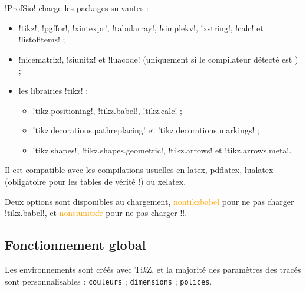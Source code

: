 \documentclass[french,a4paper,11pt]{article}
\providecommand\tikzlogo{Ti\textit{k}Z}
\let\TikZ\tikzlogo
\newcommand\Cle[1]{{\small\sffamily\textlangle \textcolor{orange}{#1}\textrangle}}
\begin{document}
{{

\begin{noteblock}
\packagetex!ProfSio! charge les packages suivantes :

\begin{itemize}
	\item \packagetex!tikz!, \packagetex!pgffor!, \packagetex!xintexpr!, \packagetex!tabularray!, \packagetex!simplekv!, \packagetex!xstring!, \packagetex!calc! et \packagetex!listofitems! ;
	\item \packagetex!nicematrix!, \packagetex!siunitx! et \packagetex!luacode! (uniquement si le compilateur détecté est ) ;
	\item les librairies \packagetex!tikz! :
	\begin{itemize}
		\item \motcletex!tikz.positioning!, \motcletex!tikz.babel!, \motcletex!tikz.calc! ;
		\item \motcletex!tikz.decorations.pathreplacing! et \motcletex!tikz.decorations.markings! ;
		\item \motcletex!tikz.shapes!, \motcletex!tikz.shapes.geometric!, \motcletex!tikz.arrows! et \motcletex!tikz.arrows.meta!.
	\end{itemize}
\end{itemize}

Il est compatible avec les compilations usuelles en \textsf{latex}, \textsf{pdflatex}, \textsf{lualatex} (obligatoire pour les tables de vérité !) ou \textsf{xelatex}.
\end{noteblock}

\begin{warningblock}
Deux options sont disponibles au chargement, \Cle{nontikzbabel} pour ne pas charger \motcletex!tikz.babel!, et \Cle{nonsiunitxfr} pour ne pas charger \motcletex!!.
\end{warningblock}

\subsection{Fonctionnement global}

\begin{tipblock}
Les environnements sont créés avec \TikZ, et la majorité des paramètres des tracés sont personnalisables : \texttt{couleurs} ; \texttt{dimensions} ; \texttt{polices}.
\end{tipblock}

}}
\end{document}
